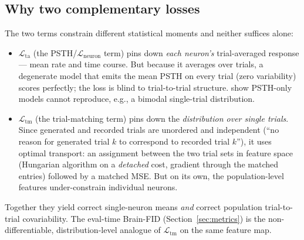 \documentclass[11pt]{article}
\begin{document}
\subsection{Why two complementary losses}
The two terms constrain different statistical moments and neither suffices alone:
\begin{itemize}[leftmargin=1.6em]
\item $\mathcal{L}_{\mathrm{ta}}$ (the PSTH/$\mathcal{L}_{\mathrm{neuron}}$ term)
pins down \emph{each neuron's} trial-averaged response --- mean rate and time
course. But because it averages over trials, a degenerate model that emits the
mean PSTH on every trial (zero variability) scores perfectly; the loss is blind
to trial-to-trial structure. \cite{sourmpis2023} show PSTH-only models cannot
reproduce, e.g., a bimodal single-trial distribution.
\item $\mathcal{L}_{\mathrm{tm}}$ (the trial-matching term) pins down the
\emph{distribution over single trials}. Since generated and recorded trials are
unordered and independent (``no reason for generated trial $k$ to correspond to
recorded trial $k$''), it uses optimal transport: an assignment between the two
trial sets in feature space (Hungarian algorithm on a \emph{detached} cost,
gradient through the matched entries) followed by a matched MSE. But on its own,
the population-level features under-constrain individual neurons.
\end{itemize}
Together they yield correct single-neuron means \emph{and} correct population
trial-to-trial covariability. The eval-time Brain-FID
(Section~\ref{sec:metrics}) is the non-differentiable, distribution-level analogue
of $\mathcal{L}_{\mathrm{tm}}$ on the same feature map.
\end{document}
